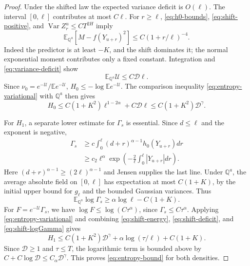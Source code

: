 \documentclass[11pt,a4paper]{amsart}
\theoremstyle{plain}
\theoremstyle{definition}
\theoremstyle{remark}
\DeclareMathOperator{\Var}{Var}
\newcommand{\EE}{\mathbb{E}}
\newcommand{\QQ}{\mathbb{Q}}
\begin{document}
\begin{proof}
Under the shifted law the expected variance deficit is $O(\ell)$. The interval $[0,\ell]$ contributes at most $C\ell$. For $r\ge\ell$, \eqref{eq:h0-bounds}, \eqref{eq:shift-positive}, and $\Var Z_r^u\le C T^{2H}$ imply
\[
 \EE_{\QQ^a}[M-f(Y_{u+r})^2]\le C(1+r/\ell)^{-4}.
\]
Indeed the predictor is at least $-K$, and the shift dominates it; the normal exponential moment contributes only a fixed constant. Integration and \eqref{eq:variance-deficit} show
\begin{equation}\label{eq:shift-deficit}
 \EE_{\QQ^a}\mathcal U\le C\mathscr D\ell.
\end{equation}
Since $\nu_0=e^{-\mathcal U}/\EE e^{-\mathcal U}$,
$H_0\le-\log\EE e^{-\mathcal U}$. The comparison inequality \eqref{eq:entropy-variational} with $\QQ^a$ then gives
\begin{equation}\label{eq:H0}
 H_0\le C(1+K^2)\ell^{1-2\alpha}+C\mathscr D\ell
       \le C(1+K^2)\mathscr D^\gamma.
\end{equation}

For $H_1$, a separate lower estimate for $\Gamma_s$ is essential. Since $d\le\ell$ and the exponent is negative,
\begin{equation}\label{eq:Gamma-boundary-lower}
 \begin{aligned}
 \Gamma_s&\ge c\int_0^\ell(d+r)^{\alpha-1}h_0(Y_{u+r})dr\\
 &\ge c_2\ell^\alpha
       \exp\left(-\frac2\ell\int_0^\ell|Y_{u+r}|dr\right).
 \end{aligned}
\end{equation}
Here $(d+r)^{\alpha-1}\ge(2\ell)^{\alpha-1}$ and Jensen supplies the last line. Under $\QQ^a$, the average absolute field on $[0,\ell]$ has expectation at most $C(1+K)$, by the initial upper bound for $g_\ell$ and the bounded Gaussian variances. Thus
\begin{equation}\label{eq:shift-logGamma}
 \EE_{\QQ^a}\log\Gamma_s\ge\alpha\log\ell-C(1+K).
\end{equation}
For $F=e^{-\mathcal U}\Gamma_s$, we have $\log F\le\log(C\tau^\alpha)$, since $\Gamma_s\le C\tau^\alpha$. Applying \eqref{eq:entropy-variational} and combining \eqref{eq:shift-energy}, \eqref{eq:shift-deficit}, and \eqref{eq:shift-logGamma} gives
\begin{equation}\label{eq:H1}
 H_1\le C(1+K^2)\mathscr D^\gamma
           +\alpha\log(\tau/\ell)+C(1+K).
\end{equation}
Since $\mathscr D\ge1$ and $\tau\le T$, the logarithmic term is bounded above by $C+C\log\mathscr D\le C_\alpha\mathscr D^\gamma$. This proves \eqref{eq:entropy-bound} for both densities.
\end{proof}
\end{document}
